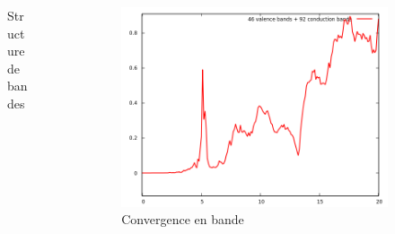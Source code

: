 \documentclass[french]{beamer}
\begin{document}
\begin{frame}
\begin{columns}
\begin{column}{\paperwidth-10pt}
\begin{figure}[!h]
    \caption{\centering Structure de bandes}\label{fig-band_1}
    \end{figure}
  \end{column}
  \begin{column}{\paperwidth-10pt}
    \begin{figure}[!h]
   \centering
    \includegraphics[width=\textwidth]{nbd_1}
    \caption{Convergence en bande}\label{fig-cv_nbd_1}
    \end{figure}
  \end{column}
\end{columns}

\end{frame}
\end{document}
